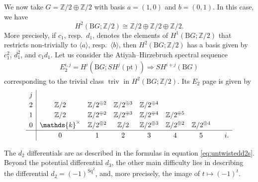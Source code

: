 \documentclass[pdftex]{sigma}
\numberwithin{equation}{section}
\begin{document}
\begin{Example}\label{ex:FSF2CZ2Z2}
We now take $G=\mathbb{Z}/2\oplus\mathbb{Z}/2$ with basis $a=(1,0)$ and $b=(0,1)$. In this case, we have
\[
H^2(\mathrm{B}G;\mathbb{Z}/2)\cong\mathbb{Z}/2\oplus\mathbb{Z}/2\oplus\mathbb{Z}/2.
\]
More precisely, if $c_1$, resp.\ $d_1$, denotes the elements of $H^1(\mathrm{B}G;\mathbb{Z}/2)$ that restricts non-trivially to $\langle a\rangle$, resp.\ $\langle b\rangle$, then $H^2(\mathrm{B}G;\mathbb{Z}/2)$ has a basis given by $c_1^2$, $d_1^2$, and $c_1d_1$. Let us consider the Atiyah--Hirzebruch spectral sequence
\begin{gather*}
E_2^{i,j}=H^i(\mathrm{B}G;SH^j(\mathrm{pt}))\Rightarrow SH^{i+j}(\mathrm{B}G)
\end{gather*}
corresponding to the trivial class $\operatorname{triv}$ in $H^2(\mathrm{B}G;\mathbb{Z}/2)$. Its $E_2$ page is given by
\begin{gather*}\renewcommand{\arraystretch}{1.2}\begin{array}{c|ccccccc}
 j \\
 2 & \mathbb{Z}/2 & \mathbb{Z}/2^{\oplus 2} & \mathbb{Z}/2^{\oplus 3} & \mathbb{Z}/2^{\oplus 4} \\
 1 & \mathbb{Z}/2 & \mathbb{Z}/2^{\oplus 2} & \mathbb{Z}/2^{\oplus 3} & \mathbb{Z}/2^{\oplus 4} & \mathbb{Z}/2^{\oplus 5}\\
 0 & \mathds{k}^{\times}& \mathbb{Z}/2^{\oplus 2} & \mathbb{Z}/2 & \mathbb{Z}/2^{\oplus 3} & \mathbb{Z}/2^{\oplus 2} & \mathbb{Z}/2^{\oplus 4} \\
 \hline
 & 0 & 1 & 2 & 3 & 4 & 5 & \quad i.
\end{array}\end{gather*}

The $d_2$ differentials are as described in the formulas in equation \eqref{eq:untwistedd2s}. Beyond the potential differential $d_3$, the other main difficulty lies in describing the differential $d_2=(-1)^{\mathrm{Sq}^2}$, and, more precisely, the image of $t\mapsto (-1)^{t}$.


\end{Example}
\end{document}
